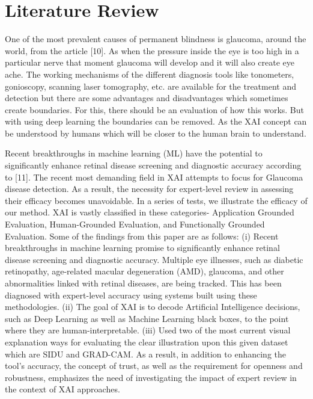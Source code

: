 \section{Literature Review} 
One of the most prevalent causes of permanent blindness is glaucoma, around the world, from the article [10]. As when the pressure inside the eye is too high in a particular nerve that moment glaucoma will develop and it will also create eye ache. The working mechanisms of the different diagnosis tools like tonometers, gonioscopy, scanning laser tomography, etc. are available for the treatment and detection but there are some advantages and disadvantages which sometimes create boundaries. For this, there should be an evaluation of how this works. But with using deep learning the boundaries can be removed. As the XAI concept can be understood by humans which will be closer to the human brain to understand.

\vspace{5mm}
\noindent Recent breakthroughs in machine learning (ML) have the potential to significantly enhance retinal disease screening and diagnostic accuracy according to [11]. The recent most demanding field in XAI attempts to focus for Glaucoma disease detection. As a result, the necessity for expert-level review in assessing their efficacy becomes unavoidable. In a series of tests, we illustrate the efficacy of our method. XAI is vastly classified in these categories- Application Grounded Evaluation, Human-Grounded Evaluation, and Functionally Grounded Evaluation. Some of the findings from this paper are as follows: (i) Recent breakthroughs in machine learning promise to significantly enhance retinal disease screening and diagnostic accuracy. Multiple eye illnesses, such as diabetic retinopathy, age-related macular degeneration (AMD), glaucoma, and other abnormalities linked with retinal diseases, are being tracked. This has been diagnosed with expert-level accuracy using systems built using these methodologies. (ii) The goal of XAI is to decode Artificial Intelligence decisions, such as Deep Learning as well as Machine Learning black boxes, to the point where they are human-interpretable. (iii) Used two of the most current visual explanation ways for evaluating the clear illustration upon this given dataset which are SIDU and GRAD-CAM. As a result, in addition to enhancing the tool’s accuracy, the concept of trust, as well as the requirement for openness and robustness, emphasizes the need of investigating the impact of expert review in the context of XAI approaches.

